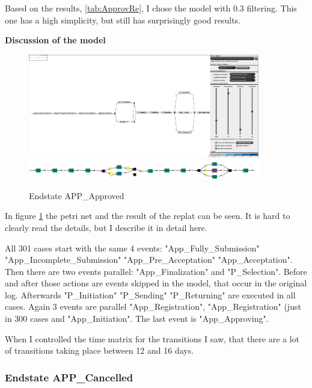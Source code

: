 Based on the results, \ref{tab:ApprovRe}, I chose the model with 0.3 filtering. This one has a high simplicity, but still has surprisingly good results.

\textbf{Discussion of the model}

\begin{figure}[!htbp]
\centering
\includegraphics[width =0.9\textwidth]{APP_ApprovedDFG0-3.PNG}  
\includegraphics[width =0.9\textwidth]{ApprovReplay.PNG}
\caption{Endstate APP\_Approved}
\label{fig:ApprovModel}
\end{figure}

In figure \ref{fig:ApprovModel} the petri net and the result of the replat can be seen. It is hard to clearly read the details, but I describe it in detail here. 

All 301 cases start with the same 4 events: "App\_Fully\_Submission" \textrightarrow "App\_Incomplete\_Submission" \textrightarrow "App\_Pre\_Acceptation" \textrightarrow "App\_Acceptation". Then there are two events parallel: "App\_Finalization" and "P\_Selection". Before and after those actions are events skipped in the model, that occur in the original log. Afterwards "P\_Initiation" \textrightarrow "P\_Sending" \textrightarrow "P\_Returning" are executed in all cases. Again 3 events are parallel "App\_Registration", "App\_Registration" (just in 300 cases and "App\_Initiation". The last event is "App\_Approving".

When I controlled the time matrix for the transitions I saw, that there are a lot of transitions taking place between 12 and 16 days.

\subsubsection{Endstate APP\_Cancelled}


